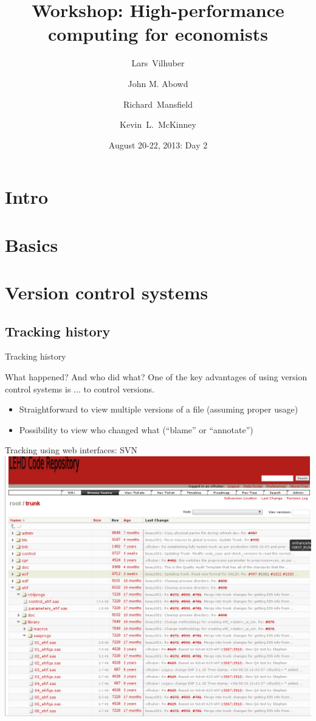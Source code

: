 \documentclass[xcolor=table,compress]{beamer}
\title[Computing for Economists]{Workshop: High-performance computing for economists}
\author[Vilhuber, Abowd, Mansfield, McKinney]{%
  Lars~Vilhuber\inst{1} \and
  John M. Abowd\inst{1} \and
  Richard~Mansfield\inst{1} \and
  Kevin~L.~McKinney %
}
\institute[Cornell]{
  \inst{1}%
   Cornell University, Economics Department,
}%
\date[August 20-22, 2013]{August 20-22, 2013: Day 2}
\begin{document}
\frame{\titlepage}
\section{Intro}
\section{Basics}
\section[VCS]{Version control systems}

\subsection{Tracking history}
\begin{frame}{Tracking history}
\begin{block}{What happened? And who did what?}
One of the key advantages of using version control systems is ... to control versions.
\begin{itemize}
\item Straightforward to view multiple versions of a file (assuming proper usage)
\item Possibility to view who changed what (``blame'' or ``annotate'')
\end{itemize}
\end{block}
\end{frame}

\begin{frame}{Tracking using web interfaces: SVN}
\includegraphics[width=.9\textwidth]{trac-svn-view1.png}
\end{frame}
\end{document}
